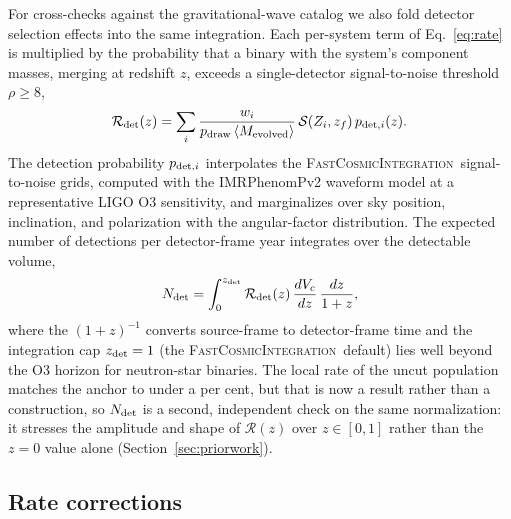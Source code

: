 \documentclass[twocolumn,apj]{openjournal}
\newcommand{\fci}{\textsc{FastCosmicIntegration}}
\newcommand{\Rz}{\mathcal{R}(z)}
\begin{document}
For cross-checks against the gravitational-wave catalog we also fold detector
selection effects into the same integration. Each per-system term of
Eq.~\ref{eq:rate} is multiplied by the probability that a binary with the
system's component masses, merging at redshift $z$, exceeds a single-detector
signal-to-noise threshold $\rho \geq 8$,
\begin{equation}
\mathcal{R}_{\rm det}(z) = \sum_i \frac{w_i}
{p_{\rm draw}\,\langle M_{\rm evolved}\rangle}\,
\mathcal{S}\!\left(Z_i, z_f\right) p_{{\rm det},i}(z).
\label{eq:detrate}
\end{equation}
The detection probability $p_{{\rm det},i}$ interpolates the \fci\
signal-to-noise grids, computed with the IMRPhenomPv2 waveform model
\citep{hannam2014,khan2016} at a representative LIGO O3 sensitivity, and
marginalizes over sky position, inclination, and polarization with the
\citet{finn1993} angular-factor distribution. The expected number of
detections per detector-frame year integrates over the detectable volume,
\begin{equation}
N_{\rm det} = \int_0^{z_{\rm det}} \mathcal{R}_{\rm det}(z)\,
\frac{dV_c}{dz}\,\frac{dz}{1+z},
\label{eq:ndet}
\end{equation}
where the $(1+z)^{-1}$ converts source-frame to detector-frame time and the
integration cap $z_{\rm det} = 1$ (the \fci\ default) lies well beyond the O3
horizon for neutron-star binaries. The local rate of the uncut population
matches the \citet{broekgaarden2021} anchor to under a per cent, but that is now
a result rather than a construction, so $N_{\rm det}$ is a second, independent
check on the same normalization: it stresses the amplitude and shape of $\Rz$
over $z \in [0, 1]$ rather than the $z = 0$ value alone
(Section~\ref{sec:priorwork}).

\subsection{Rate corrections} \label{sec:corrections}
\end{document}
